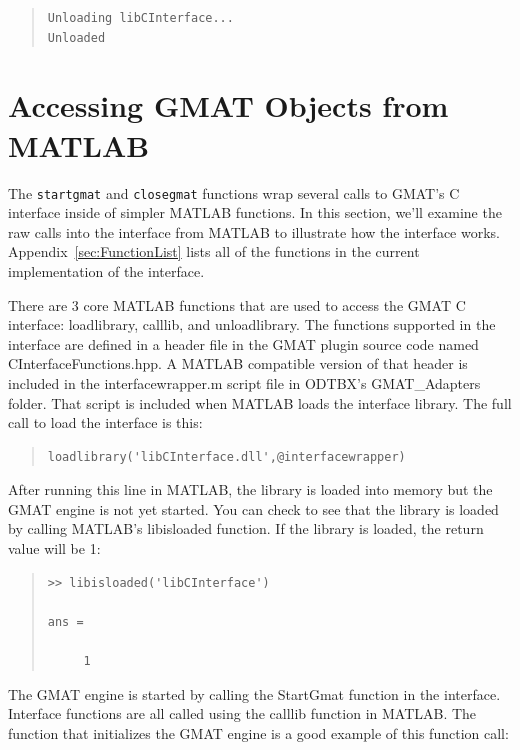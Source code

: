 \documentclass[letterpaper,10pt]{article}
\begin{document}
\begin{quote}
\begin{verbatim}
Unloading libCInterface...
Unloaded
\end{verbatim}
\end{quote}

\section{Accessing GMAT Objects from MATLAB}

The \texttt{startgmat} and \texttt{closegmat} functions wrap several calls to GMAT's C interface inside of simpler MATLAB functions.  In this section, we'll examine the raw calls into the interface from MATLAB to illustrate how the interface works.  Appendix~\ref{sec:FunctionList} lists all of the functions in the current implementation of the interface.

There are 3 core MATLAB functions that are used to access the GMAT C interface: loadlibrary, calllib, and unloadlibrary.  The functions supported in the interface are defined in a header file in the GMAT plugin source code named CInterfaceFunctions.hpp.  A MATLAB compatible version of that header is included in the interfacewrapper.m script file in ODTBX's GMAT\_Adapters folder.  That script is included when MATLAB loads the interface library.  The full call to load the interface is this:

\begin{quote}
\begin{verbatim}
loadlibrary('libCInterface.dll',@interfacewrapper)
\end{verbatim}
\end{quote}

\noindent After running this line in MATLAB, the library is loaded into memory but the GMAT engine is not yet started.  You can check to see that the library is loaded by calling MATLAB's libisloaded function.  If the library is loaded, the return value will be 1:

\begin{quote}
\begin{verbatim}
>> libisloaded('libCInterface')

ans =

     1
\end{verbatim}
\end{quote}

\noindent The GMAT engine is started by calling the StartGmat function in the interface.  Interface functions are all called using the calllib function in MATLAB.  The function that initializes the GMAT engine is a good example of this function call:
\end{document}

